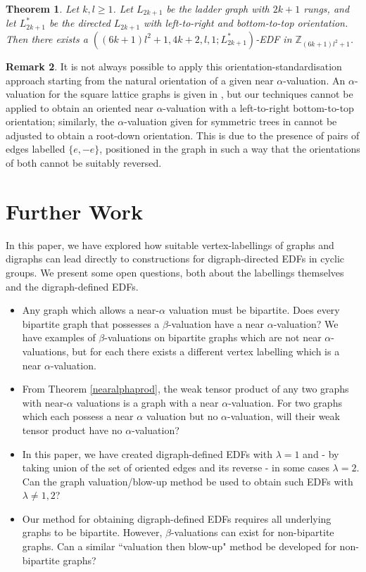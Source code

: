 \documentclass[12pt, a4paper]{article}
\newtheorem{theorem}{Theorem}[section]
\theoremstyle{definition}
\newtheorem{remark}[theorem]{Remark}
\begin{document}
\begin{theorem}
Let $k,l \geq 1$. Let $L_{2k+1}$ be the ladder graph with $2k+1$ rungs, and let $L_{2k+1}^*$ be the directed $L_{2k+1}$ with left-to-right and bottom-to-top orientation.  Then there exists a $((6k+1)l^2 +1,4k+2,l,1;L_{2k+1}^*)$-EDF in $\mathbb{Z}_{(6k+1)l^2 +1}$.
\end{theorem}

\begin{remark}
It is not always possible to apply this orientation-standardisation approach starting from the natural orientation of a given near $\alpha$-valuation.  An $\alpha$-valuation for the square lattice graphs is given in \cite{AchGil}, but our techniques cannot be applied to obtain an oriented near $\alpha$-valuation with a left-to-right bottom-to-top orientation; similarly, the $\alpha$-valuation given for symmetric trees in \cite{Rob} cannot be adjusted to obtain a root-down orientation. This is due to the presence of pairs of edges labelled $\{e,-e\}$, positioned in the graph in such a way that the orientations of both cannot be suitably reversed.
\end{remark}



\section{Further Work}
In this paper, we have explored how suitable vertex-labellings of graphs and digraphs can lead directly to constructions for digraph-directed EDFs in cyclic groups. We present some open questions, both about the labellings themselves and the digraph-defined EDFs.

\begin{itemize}
    \item Any graph which allows a near-$\alpha$ valuation must be bipartite.  Does every bipartite graph that possesses a $\beta$-valuation have a near $\alpha$-valuation? We have examples of $\beta$-valuations on bipartite graphs which are not near $\alpha$-valuations, but for each there exists a different vertex labelling which is a near $\alpha$-valuation.
    \item From Theorem \ref{nearalphaprod}, the weak tensor product of any two graphs with near-$\alpha$ valuations is a graph with a near $\alpha$-valuation. For two graphs which each possess a near $\alpha$ valuation but no $\alpha$-valuation, will their weak tensor product have no $\alpha$-valuation?
    \item In this paper, we have created digraph-defined EDFs with $\lambda = 1$ and - by taking union of the set of oriented edges and its reverse - in some cases $\lambda=2$.  Can the graph valuation/blow-up method be used to obtain such EDFs with $\lambda \neq 1,2$?
    \item Our method for obtaining digraph-defined EDFs requires all underlying graphs to be bipartite.  However, $\beta$-valuations can exist for non-bipartite graphs.  Can a similar ``valuation then blow-up" method be developed for non-bipartite graphs? 
\end{itemize}
\end{document}
